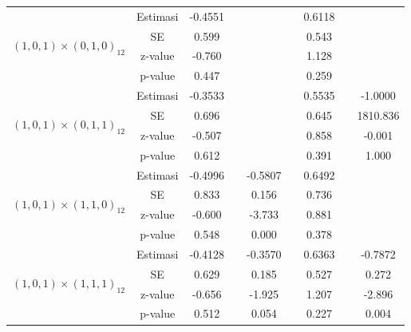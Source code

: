 \begin{enumerate}[label=\alph*.]
\begin{longtable}{|c|c|c|c|c|c|c|c|c|}
            \multirow{4}{*}{$(1,0,1)\times(0,1,0)_{12}$}
            & Estimasi & -0.4551  & {} & {} & {} & 0.6118 & {} & {}\\ \cline{2-9}
            & SE       & 0.599 & {} & {} & {} & 0.543 & {} & {}\\ \cline{2-9}
            & z-value  & -0.760   & {} & {} & {} & 1.128 & {}& {}\\ \cline{2-9}
            & p-value  & 0.447 & {} & {} & {} & 0.259 & {} & {}\\ \hline

            \multirow{4}{*}{$(1,0,1)\times(0,1,1)_{12}$}
            & Estimasi & -0.3533  & {} & {} & {} & 0.5535 & {} & -1.0000\\ \cline{2-9}
            & SE       & 0.696 & {} & {} & {} & 0.645 & {} & 1810.836\\ \cline{2-9} 
            & z-value  & -0.507  & {} & {} & {} & 0.858 & {}& -0.001\\ \cline{2-9}
            & p-value  & 0.612 & {} & {} & {} & 0.391 & {} & 1.000\\ \hline

            \multirow{4}{*}{$(1,0,1)\times(1,1,0)_{12}$}
            & Estimasi & -0.4996  & {} & -0.5807 & {} & 0.6492 & {} & {}\\ \cline{2-9}
            & SE       & 0.833 & {} & 0.156 & {} & 0.736 & {} & {}\\ \cline{2-9}
            & z-value  & -0.600  & {} & -3.733 & {} & 0.881 & {}& {}\\ \cline{2-9}
            & p-value  & 0.548 & {} & 0.000 & {} & 0.378 & {} & {}\\ \hline

            \multirow{4}{*}{$(1,0,1)\times(1,1,1)_{12}$}
            & Estimasi & -0.4128  & {} & -0.3570 & {} & 0.6363 & {} & -0.7872\\ \cline{2-9}
            & SE       &  0.629 & {} & 0.185 & {} & 0.527 & {} &  0.272 \\ \cline{2-9}
            & z-value  & -0.656  & {} & -1.925 & {} & 1.207 & {}& -2.896\\ \cline{2-9}
            & p-value  & 0.512 & {} & 0.054 & {} & 0.227 & {} & 0.004\\ \hline


\end{longtable}
\end{enumerate}
